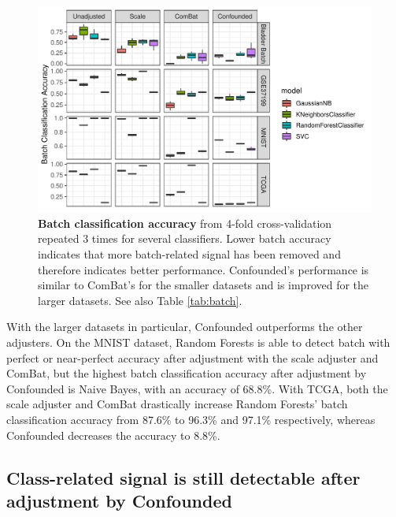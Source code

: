 \documentclass[notitlepage]{article}
\begin{document}
\begin{figure}
	\centering
	\includegraphics[width=\columnwidth]{figures/final/batch_accuracy.pdf}
	\caption{\textbf{Batch classification accuracy} from 4-fold cross-validation repeated 3 times for several classifiers.
	Lower batch accuracy indicates that more batch-related signal has been removed and therefore indicates better performance.
	Confounded's performance is similar to ComBat's for the smaller datasets and is improved for the larger datasets.
	See also Table \ref{tab:batch}.}
	\label{fig:batch}
\end{figure}
\begin{table}
	\centering
	
	\caption{\textbf{Batch classification accuracy} for several datasets and adjusters.
	The ideal batch adjuster would completely remove all signal due to batch and would therefore \textit{decrease} batch classification accuracy to around the baseline for all classifiers.
	See also Figure \ref{fig:batch}.}
	\label{tab:batch}
\end{table}

With the larger datasets in particular, Confounded outperforms the other adjusters.
On the MNIST dataset, Random Forests is able to detect batch with perfect or near-perfect accuracy after adjustment with the scale adjuster and ComBat, but the highest batch classification accuracy after adjustment by Confounded is Naive Bayes, with an accuracy of 68.8\%.
With TCGA, both the scale adjuster and ComBat drastically increase Random Forests' batch classification accuracy from 87.6\% to 96.3\% and 97.1\% respectively, whereas Confounded decreases the accuracy to 8.8\%.

\subsection{Class-related signal is still detectable after adjustment by Confounded}
\end{document}
